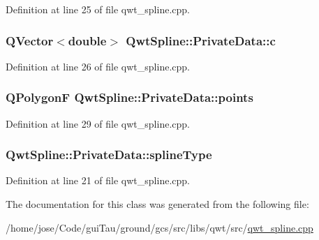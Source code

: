 Definition at line 25 of file qwt\-\_\-spline.\-cpp.

\hypertarget{class_qwt_spline_1_1_private_data_a3eb918fff20a5ef98ce4195b8df90e6a}{
\subsubsection[{c}]{\setlength{\rightskip}{0pt plus 5cm}Q\-Vector$<${\bf double}$>$ Qwt\-Spline\-::\-Private\-Data\-::c}}\label{class_qwt_spline_1_1_private_data_a3eb918fff20a5ef98ce4195b8df90e6a}


Definition at line 26 of file qwt\-\_\-spline.\-cpp.

\hypertarget{class_qwt_spline_1_1_private_data_ad8e64ad74ccca016c7d8d39a3c7c1411}{
\subsubsection[{points}]{\setlength{\rightskip}{0pt plus 5cm}Q\-Polygon\-F Qwt\-Spline\-::\-Private\-Data\-::points}}\label{class_qwt_spline_1_1_private_data_ad8e64ad74ccca016c7d8d39a3c7c1411}


Definition at line 29 of file qwt\-\_\-spline.\-cpp.

\hypertarget{class_qwt_spline_1_1_private_data_aae35237eac6ce6dad3acfe93fa7d15d4}{
\subsubsection[{spline\-Type}]{ Qwt\-Spline\-::\-Private\-Data\-::spline\-Type}}\label{class_qwt_spline_1_1_private_data_aae35237eac6ce6dad3acfe93fa7d15d4}


Definition at line 21 of file qwt\-\_\-spline.\-cpp.



The documentation for this class was generated from the following file\-:\begin{DoxyCompactItemize}
\item 
/home/jose/\-Code/gui\-Tau/ground/gcs/src/libs/qwt/src/\hyperlink{qwt__spline_8cpp}{qwt\-\_\-spline.\-cpp}\end{DoxyCompactItemize}
